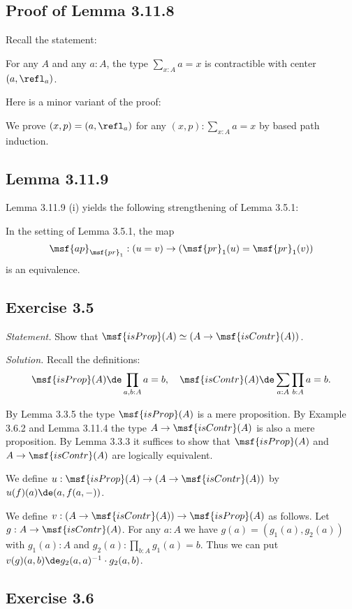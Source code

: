 \documentclass[12pt]{article}
\begin{document}

\subsection{Proof of Lemma 3.11.8} 

Recall the statement: 

For any $A$ and any $a:A$, the type $\sum_{x:A}a=x$ is contractible with center $(a,\refl_a)$. 

Here is a minor variant of the proof:

We prove $(x,p)=(a,\refl_a)$ for any $(x,p):\sum_{x:A}a=x$ by based path induction.


\subsection{Lemma 3.11.9}

Lemma 3.11.9 (i) yields the following strengthening of Lemma 3.5.1:

In the setting of Lemma 3.5.1, the map 
$$
\msf{ap}_{\msf{pr}_1}:(u=v)\to(\msf{pr}_1(u)=\msf{pr}_1(v))
$$ 
is an equivalence.


\subsection{Exercise 3.5}

\emph{Statement.} Show that $\msf{isProp}(A)\simeq(A\to\msf{isContr}(A))$. 

\nn\emph{Solution.} Recall the definitions: 
$$
\msf{isProp}(A)\de\prod_{a,b:A}a=b,\quad\msf{isContr}(A)\de\sum_{a:A}\prod_{b:A}a=b.
$$

By Lemma 3.3.5 the type $\msf{isProp}(A)$ is a mere proposition. By Example 3.6.2 and Lemma 3.11.4 the type $A\to\msf{isContr}(A)$ is also a mere proposition. By Lemma 3.3.3 it suffices to show that $\msf{isProp}(A)$ and $A\to\msf{isContr}(A)$ are logically equivalent. 

We define $u:\msf{isProp}(A)\to(A\to\msf{isContr}(A))$ by $u(f)(a)\de(a,f(a,-))$. 

We define $v:(A\to\msf{isContr}(A))\to\msf{isProp}(A)$ as follows. Let $g:A\to\msf{isContr}(A)$. For any $a:A$ we have $g(a)=(g_1(a),g_2(a))$ with $g_1(a):A$ and $g_2(a):\prod_{b:A}g_1(a)=b$. Thus we can put $v(g)(a,b)\de g_2(a,a)^{-1}\cdot g_2(a,b)$.



\subsection{Exercise 3.6}
\end{document}
